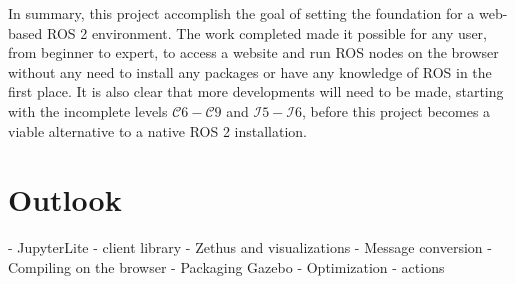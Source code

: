 In summary, this project accomplish the goal of setting the foundation for a web-based \ac{ROS} 2 environment. The work completed made it possible for any user, from beginner to expert, to access a website and run \ac{ROS} nodes on the browser without any need to install any packages or have any knowledge of \ac{ROS} in the first place. It is also clear that more developments will need to be made, starting with the incomplete levels $\mathcal{C}6-\mathcal{C}9$ and $\mathcal{I}5-\mathcal{I}6$, before this project becomes a viable alternative to a native \ac{ROS} 2 installation.


\section{Outlook}

- JupyterLite
- client library
- Zethus and visualizations
- Message conversion
- Compiling on the browser
- Packaging Gazebo
- Optimization
- actions
